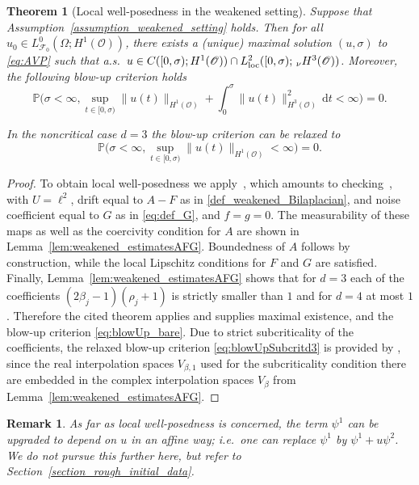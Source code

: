 \documentclass[reqno]{amsart}
\newtheorem{theorem}[Satz]{Theorem}
\newtheorem{remark}[Satz]{Remark}
\newcommand{\F}{\mathscr{F}}
\renewcommand{\P}{\mathbb{P}}
\newcommand{\sO}{\mathscr{O}}
\newcommand{\1}{\mathbf{1}}
\newcommand{\dt}{\,\mathrm{d}t}
\newcommand{\loc}{\textup{loc}}
\newcommand{\nH}{\ensuremath{\,_\nu H}}
\begin{document}
\begin{theorem}[Local well-posedness in the weakened setting] \label{thm:localWP_weakened}
Suppose that Assumption~\ref{assumption_weakened_setting} holds. Then for all $u_0\in L^0_{\F_0}(\Omega;H^1(\sO))$, there exists a (unique) maximal solution $(u,\sigma)$ to \eqref{eq:AVP} such that a.s.\ $u\in C([0,\sigma);H^1(\sO))\cap L^2_{\loc}([0,\sigma);\nH^3(\sO))$. Moreover, the following blow-up criterion holds
\begin{equation}
    \label{eq:blowUp_bare}
    \P \bigg(\sigma < \infty ,\sup\limits_{t\in [0,\sigma)} \| u(t) \|_{H^1(\sO)} + \int_0^\sigma \|u(t) \|^2_{H^3(\sO)} \dt<\infty  \bigg) =0.
\end{equation}

In the noncritical case $d=3$ the blow-up criterion can be relaxed to 
\begin{equation}
    \label{eq:blowUpSubcritd3}
    \P \bigg(\sigma < \infty ,\sup\limits_{t\in [0,\sigma)} \| u(t) \|_{H^1(\sO)} <\infty  \bigg) =0.
\end{equation}
\end{theorem}
\begin{proof}
     To obtain local well-posedness we apply~\cite[Theorem~3.3]{agrestiCriticalVariationalSetting2024a}, which amounts to checking~\cite[Assumption~3.1]{agrestiCriticalVariationalSetting2024a}, with $U = \ell^2$, drift equal to $A - F$ as in \eqref{def_weakened_Bilaplacian}, and noise coefficient equal to $G$ as in \eqref{eq:def_G}, and $f = g = 0$. The measurability of these maps as well as the coercivity condition for $A$ are shown in Lemma~\ref{lem:weakened_estimatesAFG}. Boundedness of $A$ follows by construction, while the local Lipschitz conditions for $F$ and $G$ are satisfied. Finally, Lemma~\ref{lem:weakened_estimatesAFG} shows that for $d=3$ each of the coefficients $(2\beta_j-1)(\rho_j+1)$ is strictly smaller than $1$ and for $d=4$ at most $1$. Therefore the cited theorem applies and supplies maximal existence, and the blow-up criterion \eqref{eq:blowUp_bare}. Due to strict subcriticality of the coefficients, the relaxed blow-up criterion \eqref{eq:blowUpSubcritd3} is provided by \cite[Thm.~6.2]{agrestiNonlinearSPDEsMaximal2025}, since the real interpolation spaces $V_{\beta,1}$ used for the subcriticality condition there are embedded in the complex interpolation spaces $V_{\beta}$ from Lemma~\ref{lem:weakened_estimatesAFG}.
\end{proof}    

\begin{remark}
    As far as local well-posedness is concerned, the term $\psi^1$ can be upgraded to depend on $u$ in an affine way; i.e.\ one can replace $\psi^1$ by $\psi^{1} + u \psi^{2}$. We do not pursue this further here, but refer to Section~\ref{section_rough_initial_data}.
\end{remark}
\end{document}
